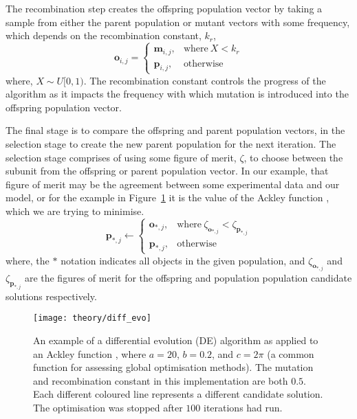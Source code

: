The recombination step creates the offspring population vector by taking a sample from either the parent population or mutant vectors with some frequency, which depends on the recombination constant, $k_r$,
%
\begin{equation}
    \mathbf{o}_{i,j} =
  \begin{cases}
    \mathbf{m}_{i,j}, & \text{where}\ X < k_r \\
    \mathbf{p}_{i,j}, & \text{otherwise}
  \end{cases}
\end{equation}
%
where, $X\sim U[0, 1)$.
The recombination constant controls the progress of the algorithm as it impacts the frequency with which mutation is introduced into the offspring population vector.

The final stage is to compare the offspring and parent population vectors, in the selection stage to create the new parent population for the next iteration.
The selection stage comprises of using some figure of merit, $\zeta$, to choose between the subunit from the offspring or parent population vector.
In our example, that figure of merit may be the agreement between some experimental data and our model, or for the example in Figure~\ref{fig:diff_evo} it is the value of the Ackley function \cite{ackley_connectionist_1987}, which we are trying to minimise.
%
\begin{equation}
    \mathbf{p}_{*,j} \leftarrow
    \begin{cases}
        \mathbf{o}_{*,j}, & \text{where}\ \zeta_{\mathbf{o}_{*,j}} < \zeta_{\mathbf{p}_{*,j}} \\
        \mathbf{p}_{*,j}, & \text{otherwise}
    \end{cases}
\end{equation}
%
where, the $*$ notation indicates all objects in the given population, and $\zeta_{\mathbf{o}_{*,j}}$ and $\zeta_{\mathbf{p}_{*,j}}$ are the figures of merit for the offspring and population population candidate solutions respectively.
%
\begin{figure}
    \centering
    \texttt{[image: theory/diff\_evo]}
    \caption{An example of a differential evolution (DE) algorithm as applied to an Ackley function \cite{ackley_connectionist_1987}, where $a=20$, $b=0.2$, and $c=2\pi$ (a common function for assessing global optimisation methods). The mutation and recombination constant in this implementation are both $0.5$. Each different coloured line represents a different candidate solution. The optimisation was stopped after $100$ iterations had run.}
    \label{fig:diff_evo}
\end{figure}
%

